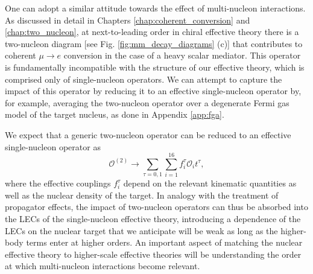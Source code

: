 \documentclass[12pt,letterpaper]{book}
\begin{document}
One can adopt a similar attitude towards the effect of multi-nucleon interactions. As discussed in detail in Chapters \ref{chap:coherent_conversion} and \ref{chap:two_nucleon}, at next-to-leading order in chiral effective theory there is a two-nucleon diagram [see Fig. \ref{fig:mm_decay_diagrams} (c)] that contributes to coherent $\mu\rightarrow e$ conversion in the case of a heavy scalar mediator. This operator is fundamentally incompatible with the structure of our effective theory, which is comprised only of single-nucleon operators. We can attempt to capture the impact of this operator by reducing it to an effective single-nucleon operator by, for example, averaging the two-nucleon operator over a degenerate Fermi gas model of the target nucleus, as done in Appendix \ref{app:fga}.

We expect that a generic two-nucleon operator can be reduced to an effective single-nucleon operator as
\begin{equation}
\mathcal{O}^{(2)}\rightarrow \sum_{\tau=0,1}\sum_{i=1}^{16}f_i^{\tau}\mathcal{O}_it^{\tau},
\end{equation}
where the effective couplings $f_i^{\tau}$ depend on the relevant kinematic quantities as well as the nuclear density of the target. In analogy with the treatment of propagator effects, the impact of two-nucleon operators can thus be absorbed into the LECs of the single-nucleon effective theory, introducing a dependence of the LECs on the nuclear target that we anticipate will be weak as long as the higher-body terms enter at higher orders. An important aspect of matching the nuclear effective theory to higher-scale effective theories will be understanding the order at which multi-nucleon interactions become relevant.
\end{document}

